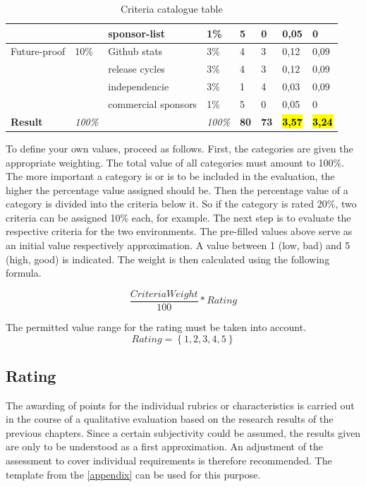 \documentclass[MIC,Master,english]{twbook}%
\begin{document}
\begin{table}[ht]
\begin{center}
{\begin{tabular}{|l|l|l|l|l|l|l|l|}
            & & sponsor-list & 1\% & 5 & 0 & 0,05 & 0 \\
            \hline
            Future-proof & 10\% & Github stats & 3\% & 4 & 3 & 0,12 & 0,09 \\
            & & release cycles & 3\% & 4 & 3 & 0,12 & 0,09 \\
            & & independencie & 3\% & 1 & 4 & 0,03 & 0,09 \\
            & & commercial sponsors & 1\% & 5 & 0 & 0,05 & 0 \\
            \hline \hline
            \textbf{Result} & \textit{100\%} & & \textit{100\%} & \textbf{80} & \textbf{73} & \hl{\textbf{3,57}} & \hl{\textbf{3,24}} \\
            \hline
        \end{tabular}}
        \caption{Criteria catalogue table}
        \label{tab:cct}
    \end{center}
\end{table}
To define your own values, proceed as follows. First, the categories are given the appropriate weighting. The total value of all categories must amount to 100\%. The more important a category is or is to be included in the evaluation, the higher the percentage value assigned should be. Then the percentage value of a category is divided into the criteria below it. So if the category is rated 20\%, two criteria can be assigned 10\% each, for example. The next step is to evaluate the respective criteria for the two environments. The pre-filled values above serve as an initial value respectively approximation. A value between 1 (low, bad) and 5 (high, good) is indicated. The weight is then calculated using the following formula.

\begin{equation*}
    \frac{CriteriaWeight}{100}*Rating
\end{equation*}

The permitted value range for the rating must be taken into account.
\begin{equation*}
    Rating = \left\{1,2,3,4,5 \right\}
\end{equation*}

\subsection{Rating}
The awarding of points for the individual rubrics or characteristics is carried out in the course of a qualitative evaluation based on the research results of the previous chapters. Since a certain subjectivity could be assumed, the results given are only to be understood as a first approximation. An adjustment of the assessment to cover individual requirements is therefore recommended. The template from the \autoref{appendix} can be used for this purpose.
\end{document}
